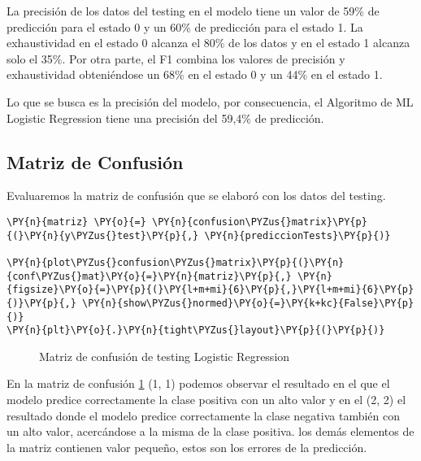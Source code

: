     La precisión de los datos del testing en el modelo tiene un valor de
59\% de predicción para el estado 0 y un 60\% de predicción para el
estado 1. La exhaustividad en el estado 0 alcanza el 80\% de los datos y
en el estado 1 alcanza solo el 35\%. Por otra parte, el F1 combina los
valores de precisión y exhaustividad obteniéndose un 68\% en el estado 0
y un 44\% en el estado 1.

Lo que se busca es la precisión del modelo, por consecuencia, el
Algoritmo de ML Logistic Regression tiene una precisión
del 59,4\% de predicción.

    \hypertarget{matriz-de-confusiuxf3n}{%
\subsection{Matriz de Confusión}\label{matriz-de-confusiuxf3n}}

Evaluaremos la matriz de confusión que se elaboró con los datos del
testing.

    \begin{tcolorbox}[breakable, size=fbox, boxrule=1pt, pad at break*=1mm,colback=cellbackground, colframe=cellborder]
\begin{Verbatim}[commandchars=\\\{\}]
\PY{n}{matriz} \PY{o}{=} \PY{n}{confusion\PYZus{}matrix}\PY{p}{(}\PY{n}{y\PYZus{}test}\PY{p}{,} \PY{n}{prediccionTests}\PY{p}{)}

\PY{n}{plot\PYZus{}confusion\PYZus{}matrix}\PY{p}{(}\PY{n}{conf\PYZus{}mat}\PY{o}{=}\PY{n}{matriz}\PY{p}{,} \PY{n}{figsize}\PY{o}{=}\PY{p}{(}\PY{l+m+mi}{6}\PY{p}{,}\PY{l+m+mi}{6}\PY{p}{)}\PY{p}{,} \PY{n}{show\PYZus{}normed}\PY{o}{=}\PY{k+kc}{False}\PY{p}{)}
\PY{n}{plt}\PY{o}{.}\PY{n}{tight\PYZus{}layout}\PY{p}{(}\PY{p}{)}
\end{Verbatim}
\end{tcolorbox}

\begin{center}
    	\begin{figure}[H]
	\centering
	\caption{Matriz de confusión de testing Logistic Regression }
	\label{fig:aNISSh}
	\end{figure}
\end{center}
    
    En la matriz de confusión \ref{fig:aNISSh} (1, 1) podemos observar el resultado en el que
el modelo predice correctamente la clase positiva con un alto valor y en
el (2, 2) el resultado donde el modelo predice correctamente la clase
negativa también con un alto valor, acercándose a la misma de la clase
positiva. los demás elementos de la matriz contienen valor pequeño,
estos son los errores de la predicción.

